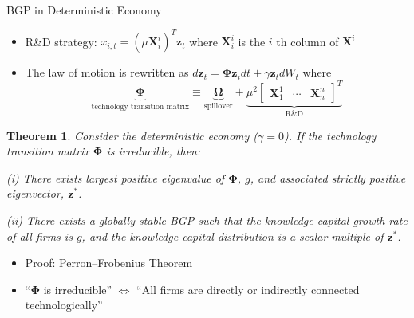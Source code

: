 \documentclass[
  aspectratio=169,  %
  handout           %
]{beamer}
\theoremstyle{plain}
\newtheorem*{thm*}{Theorem}
\begin{document}
%
\begin{frame}{BGP in Deterministic Economy}
  \begin{itemize}
    \item R\&D strategy: $x_{i,t}=\left(\mu \symbf{X}_{i}^{i}\right)^{T}\symbf{z}_{t}$
          where $\symbf{X}_{i}^{i}$ is the $i$ th column of $\symbf{X}^{i}$
    \item The law of motion is rewritten as $d\symbf{z}_{t}=\symbf{\Phi}\symbf{z}_{t}dt+\gamma\symbf{z}_{t}dW_{t}$
          where
          \[
            \underbrace{\symbf{\Phi}}_{\text{technology transition matrix}}\equiv\underbrace{\symbf{\Omega}}_{\text{spillover}}+\underbrace{\mu^{2}\left[\begin{array}{ccc}
              \symbf{X}_{1}^{1} & \cdots & \symbf{X}_{n}^{n}\end{array}\right]^{T}}_{\text{R\&D}}
          \]
          \vspace{-5mm}
  \end{itemize}
  \begin{thm*}
    Consider the deterministic economy ($\gamma=0$). If the technology
    transition matrix $\symbf{\Phi}$ is irreducible, then:

    (i) There exists largest positive eigenvalue of $\symbf{\Phi}$, $g$, and
    associated strictly positive eigenvector, $\symbf{z}^{*}$.

    (ii) There exists a globally stable BGP such that the knowledge capital
    growth rate of all firms is $g$, and the knowledge capital distribution
    is a scalar multiple of $\symbf{z}^{*}$.
  \end{thm*}
  \begin{itemize}
    \item Proof: Perron--Frobenius Theorem
    \item ``$\symbf{\Phi}$ is irreducible'' $\Longleftrightarrow$ ``All firms are
          directly or indirectly connected technologically''
  \end{itemize}
\end{frame}
%
\end{document}
